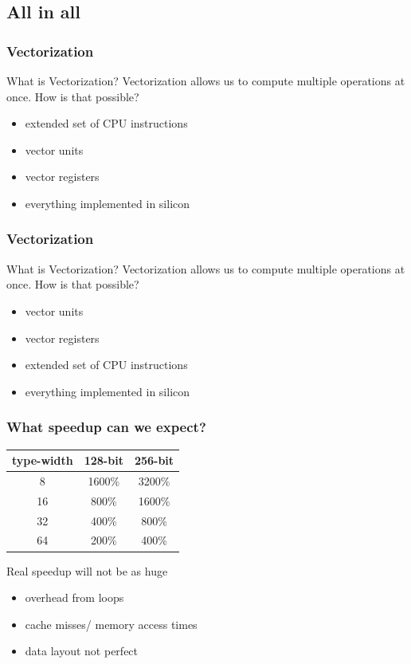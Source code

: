 \documentclass[compress]{beamer}
\begin{document}
\subsection{All in all}
\begin{frame}[fragile]
    \frametitle{Vectorization}
What is Vectorization?\newline\newline
Vectorization allows us to compute multiple operations at once.\newline\newline
How is that possible?
    \begin{itemize}
        \item extended set of CPU instructions
        \item vector units
        \item vector registers 
        \item everything implemented in silicon
    \end{itemize}
\end{frame}
\begin{frame}[fragile]
    \frametitle{Vectorization}
What is Vectorization?\newline\newline
Vectorization allows us to compute multiple operations at once.\newline\newline
How is that possible?
    \begin{itemize}
        \item vector units
        \item vector registers 
        \item extended set of CPU instructions
        \item everything implemented in silicon
    \end{itemize}
\end{frame}
\begin{frame}
    \frametitle{What speedup can we expect?}
    \begin{tabular}{c | c | c}
        type-width & 128-bit & 256-bit \\
        \hline
        8            & 1600\% &  3200\% \\
        16           & 800\% &   1600\% \\
        32           & 400\%  &   800\% \\
        64          & 200\% & 400\% \\ 
        \hline
    \end{tabular} 
    \newline
    \newline
    Real speedup will not be as huge
    \begin{itemize}
        \item overhead from loops
        \item cache misses/ memory access times
        \item data layout not perfect
    \end{itemize}
\end{frame}
\end{document}

